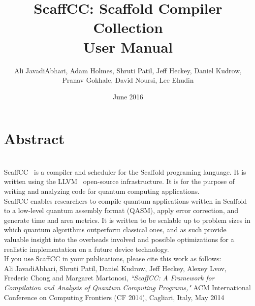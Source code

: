 \documentclass[12pt]{report}
\begin{document}
\title{
    {ScaffCC: Scaffold Compiler Collection}\\
    {\large User Manual}\\
}


\author{Ali JavadiAbhari, Adam Holmes, Shruti Patil, Jeff Heckey, Daniel Kudrow,\\ Pranav Gokhale, David Noursi, Lee Ehudin}

\date{June 2016}



\maketitle

\chapter*{Abstract}
~\\

ScaffCC~\cite{scaffcc} is a compiler and scheduler for the Scaffold programing language. It is written using the LLVM~\cite{LLVM} open-source infrastructure. It is for the purpose of writing and analyzing code for quantum computing applications.\\

ScaffCC enables researchers to compile quantum applications written in Scaffold to a low-level quantum assembly format (QASM), apply error correction, and generate time and area metrics. It is written to be scalable up to problem sizes in which quantum algorithms outperform classical ones, and as such provide valuable insight into the overheads involved and possible optimizations for a realistic implementation on a future device technology.\\

If you use ScaffCC in your publications, please cite this work as follows:\\

Ali JavadiAbhari, Shruti Patil, Daniel Kudrow, Jeff Heckey, Alexey Lvov, Frederic Chong and Margaret Martonosi, {\em``ScaffCC: A Framework for Compilation and Analysis of Quantum Computing Programs,"} ACM International Conference on Computing Frontiers (CF 2014), Cagliari, Italy, May 2014\\

\tableofcontents










\end{document}
